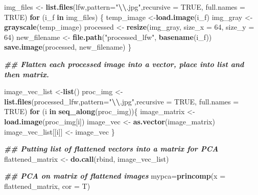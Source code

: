 \documentclass[
]{article}
\newenvironment{Shaded}{\begin{snugshade}}{\end{snugshade}}
\newcommand{\AttributeTok}[1]{\textcolor[rgb]{0.13,0.29,0.53}{#1}}
\newcommand{\ConstantTok}[1]{\textcolor[rgb]{0.56,0.35,0.01}{#1}}
\newcommand{\ControlFlowTok}[1]{\textcolor[rgb]{0.13,0.29,0.53}{\textbf{#1}}}
\newcommand{\DecValTok}[1]{\textcolor[rgb]{0.00,0.00,0.81}{#1}}
\newcommand{\DocumentationTok}[1]{\textcolor[rgb]{0.56,0.35,0.01}{\textbf{\textit{#1}}}}
\newcommand{\FunctionTok}[1]{\textcolor[rgb]{0.13,0.29,0.53}{\textbf{#1}}}
\newcommand{\NormalTok}[1]{#1}
\newcommand{\OtherTok}[1]{\textcolor[rgb]{0.56,0.35,0.01}{#1}}
\newcommand{\SpecialCharTok}[1]{\textcolor[rgb]{0.81,0.36,0.00}{\textbf{#1}}}
\newcommand{\StringTok}[1]{\textcolor[rgb]{0.31,0.60,0.02}{#1}}
\begin{document}
\begin{Shaded}
\begin{Highlighting}[]
\NormalTok{img\_files }\OtherTok{\textless{}{-}} \FunctionTok{list.files}\NormalTok{(}\StringTok{\textquotesingle{}lfw\textquotesingle{}}\NormalTok{,}\AttributeTok{pattern=}\StringTok{"}\SpecialCharTok{\textbackslash{}\textbackslash{}}\StringTok{.jpg"}\NormalTok{,}\AttributeTok{recursive =} \ConstantTok{TRUE}\NormalTok{, }\AttributeTok{full.names =} \ConstantTok{TRUE}\NormalTok{)}
\ControlFlowTok{for}\NormalTok{ (i\_f  }\ControlFlowTok{in}\NormalTok{ img\_files) \{}
\NormalTok{  temp\_image }\OtherTok{\textless{}{-}}\FunctionTok{load.image}\NormalTok{(i\_f)}
\NormalTok{  img\_gray }\OtherTok{\textless{}{-}} \FunctionTok{grayscale}\NormalTok{(temp\_image)}
\NormalTok{  processed }\OtherTok{\textless{}{-}} \FunctionTok{resize}\NormalTok{(img\_gray, }\AttributeTok{size\_x =} \DecValTok{64}\NormalTok{, }\AttributeTok{size\_y =} \DecValTok{64}\NormalTok{)}
\NormalTok{  new\_filename }\OtherTok{\textless{}{-}} \FunctionTok{file.path}\NormalTok{(}\StringTok{"processed\_lfw"}\NormalTok{, }\FunctionTok{basename}\NormalTok{(i\_f))}
  \FunctionTok{save.image}\NormalTok{(processed, new\_filename)}
\NormalTok{  \}}

\DocumentationTok{\#\# Flatten each processed image into a vector, place into list and then matrix.}

\NormalTok{image\_vec\_list }\OtherTok{\textless{}{-}}\FunctionTok{list}\NormalTok{()}
\NormalTok{proc\_img }\OtherTok{\textless{}{-}} \FunctionTok{list.files}\NormalTok{(}\StringTok{\textquotesingle{}processed\_lfw\textquotesingle{}}\NormalTok{,}\AttributeTok{pattern=}\StringTok{"}\SpecialCharTok{\textbackslash{}\textbackslash{}}\StringTok{.jpg"}\NormalTok{,}\AttributeTok{recursive =} \ConstantTok{TRUE}\NormalTok{, }\AttributeTok{full.names =} \ConstantTok{TRUE}\NormalTok{)}
\ControlFlowTok{for}\NormalTok{ (i }\ControlFlowTok{in} \FunctionTok{seq\_along}\NormalTok{(proc\_img))\{}
\NormalTok{  image\_matrix }\OtherTok{\textless{}{-}} \FunctionTok{load.image}\NormalTok{(proc\_img[i])}
\NormalTok{  image\_vec }\OtherTok{\textless{}{-}} \FunctionTok{as.vector}\NormalTok{(image\_matrix)}
\NormalTok{  image\_vec\_list[[i]] }\OtherTok{\textless{}{-}}\NormalTok{ image\_vec}
\NormalTok{  \}}
 
 
\DocumentationTok{\#\# Putting list of flattened vectors into a matrix for PCA}
\NormalTok{flattened\_matrix }\OtherTok{\textless{}{-}} \FunctionTok{do.call}\NormalTok{(rbind, image\_vec\_list) }

\DocumentationTok{\#\# PCA on matrix of flattened images}
\NormalTok{mypca}\OtherTok{=}\FunctionTok{princomp}\NormalTok{(}\AttributeTok{x =}\NormalTok{ flattened\_matrix, }\AttributeTok{cor =}\NormalTok{ T)}


\end{Highlighting}
\end{Shaded}
\end{document}
